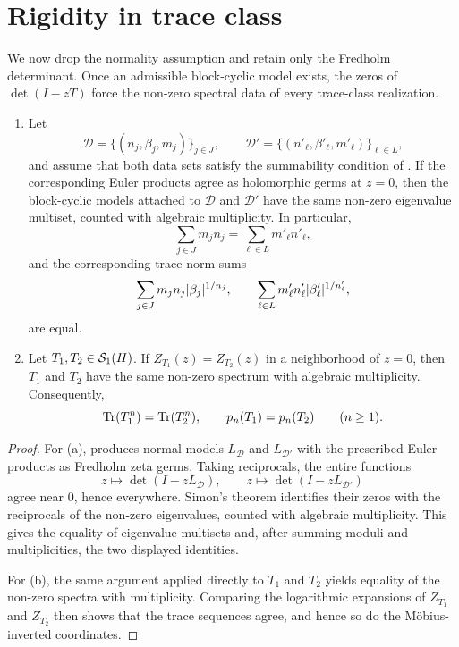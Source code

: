 \section{Rigidity in trace class}
\label{sec:rigidity}

We now drop the normality assumption and retain only the Fredholm
determinant. Once an admissible block-cyclic model exists, the zeros of
\(\det(I-zT)\) force the non-zero spectral data of every trace-class
realization.

\begin{proposition}
  \label{prop:fredholm-factorisation-rigidity}
  \begin{enumerate}[label=\textup{(\alph*)}]
    \item Let
      \[
        \mathcal D=\{(n_j,\beta_j,m_j)\}_{j\in J},
        \qquad
        \mathcal D'=\{(n'_\ell,\beta'_\ell,m'_\ell)\}_{\ell\in L},
      \]
      and assume that both data sets satisfy the summability condition
      of . If the corresponding
      Euler products agree as holomorphic germs at \(z=0\), then the
      block-cyclic models attached to \(\mathcal D\) and
      \(\mathcal D'\) have the same non-zero eigenvalue multiset,
      counted with algebraic multiplicity.
      In particular,
      \[
        \sum_{j\in J}m_jn_j=\sum_{\ell\in L}m'_\ell n'_\ell,
      \]
      and the corresponding trace-norm sums
      \[
        \sum_{j\in J}m_jn_j\lvert \beta_j \rvert^{1/n_j},
        \qquad
        \sum_{\ell\in L}m'_\ell n'_\ell\lvert \beta'_\ell \rvert^{1/n'_\ell},
      \]
      are equal.
    \item Let \(T_1,T_2\in \mathcal S_1(H)\). If
      \(
        Z_{T_1}(z)=Z_{T_2}(z)
      \)
      in a neighborhood of \(z=0\), then \(T_1\) and \(T_2\) have the
      same non-zero spectrum with algebraic multiplicity. Consequently,
      \[
        \operatorname{Tr}(T_1^n)=\operatorname{Tr}(T_2^n),
        \qquad
        p_n(T_1)=p_n(T_2)
        \qquad (n\ge 1).
      \]
  \end{enumerate}
\end{proposition}

\begin{proof}
  For \textup{(a)},  produces
  normal models \(L_{\mathcal D}\) and \(L_{\mathcal D'}\) with the
  prescribed Euler products as Fredholm zeta germs. Taking reciprocals,
  the entire functions
  \[
    z\mapsto \det(I-zL_{\mathcal D}),
    \qquad
    z\mapsto \det(I-zL_{\mathcal D'})
  \]
  agree near \(0\), hence everywhere. Simon's theorem
  \cite[Theorem~3.7]{Simon2005TraceIdeals} identifies their zeros with
  the reciprocals of the non-zero eigenvalues, counted with algebraic
  multiplicity. This gives the equality of eigenvalue multisets and,
  after summing moduli and multiplicities, the two displayed identities.

  For \textup{(b)}, the same argument applied directly to \(T_1\) and
  \(T_2\) yields equality of the non-zero spectra with multiplicity.
  Comparing the logarithmic expansions of \(Z_{T_1}\) and \(Z_{T_2}\)
  then shows that the trace sequences agree, and hence so do the
  M\"obius-inverted coordinates.
\end{proof}

